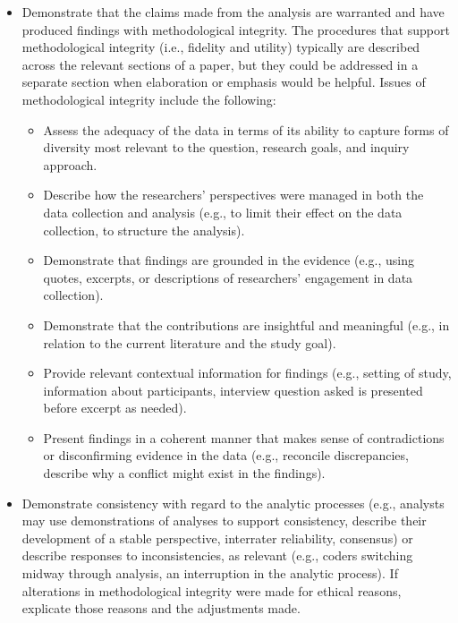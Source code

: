 \documentclass[acmsmall,screen,anonymous,review]{acmart}
\begin{document}
\begin{itemize}
    \item Demonstrate that the claims made from the analysis are warranted and have produced findings with methodological integrity. The procedures that support methodological integrity (i.e., fidelity and utility) typically are described across the relevant sections of a paper, but they could be addressed in a separate section when elaboration or emphasis would be helpful. Issues of methodological integrity include the following:
    \begin{itemize}
        \item Assess the adequacy of the data in terms of its ability to capture forms of diversity most relevant to the question, research goals, and inquiry approach.
        \item Describe how the researchers’ perspectives were managed in both the data collection
        and analysis (e.g., to limit their effect on the data collection, to structure the analysis).
        \item Demonstrate that findings are grounded in the evidence (e.g., using quotes, excerpts, or
        descriptions of researchers’ engagement in data collection).
        \item Demonstrate that the contributions are insightful and meaningful (e.g., in relation to the
        current literature and the study goal).
        \item Provide relevant contextual information for findings (e.g., setting of study, information
        about participants, interview question asked is presented before excerpt as needed).
        \item Present findings in a coherent manner that makes sense of contradictions or disconfirming evidence in the data (e.g., reconcile discrepancies, describe why a conflict might exist in the findings).
    \end{itemize}

    \item Demonstrate consistency with regard to the analytic processes (e.g., analysts may use demonstrations of analyses to support consistency, describe their development of a stable perspective, interrater reliability, consensus) or describe responses to inconsistencies, as relevant (e.g., coders switching midway through analysis, an interruption in the analytic
    process). If alterations in methodological integrity were made for ethical reasons, explicate those reasons and the adjustments made.


\end{itemize}
\end{document}
